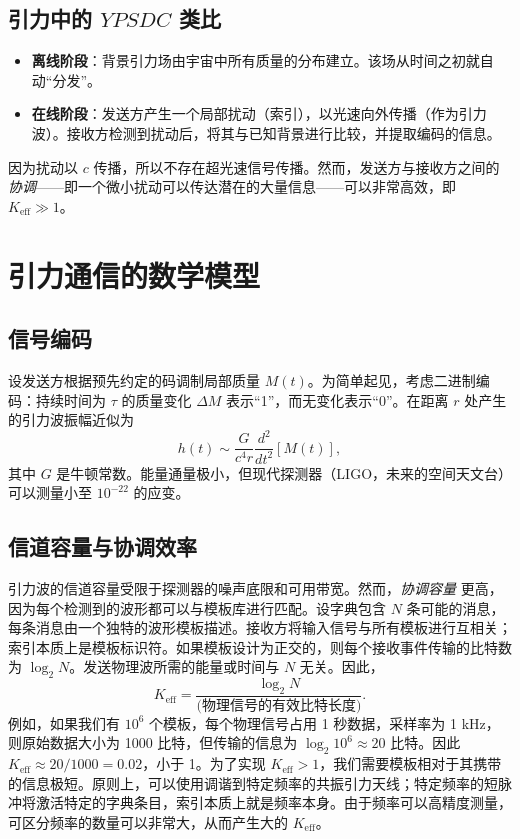 \documentclass[12pt,a4paper]{article}
\newcommand{\Keff}{K_{\mathrm{eff}}}
\newcommand{\YPSDC}{YPSDC}
\begin{document}
	\subsection{引力中的 \(\YPSDC\) 类比}
	
	\begin{itemize}
		\item \textbf{离线阶段}：背景引力场由宇宙中所有质量的分布建立。该场从时间之初就自动“分发”。
		\item \textbf{在线阶段}：发送方产生一个局部扰动（索引），以光速向外传播（作为引力波）。接收方检测到扰动后，将其与已知背景进行比较，并提取编码的信息。
	\end{itemize}
	
	因为扰动以 \(c\) 传播，所以不存在超光速信号传播。然而，发送方与接收方之间的 \emph{协调}——即一个微小扰动可以传达潜在的大量信息——可以非常高效，即 \(\Keff \gg 1\)。
	
	\section{引力通信的数学模型}
	\label{sec:model}
	
	\subsection{信号编码}
	
	设发送方根据预先约定的码调制局部质量 \(M(t)\)。为简单起见，考虑二进制编码：持续时间为 \(\tau\) 的质量变化 \(\Delta M\) 表示“1”，而无变化表示“0”。在距离 \(r\) 处产生的引力波振幅近似为
	\begin{equation}
		h(t) \sim \frac{G}{c^4 r} \frac{d^2}{dt^2} \left[ M(t) \right],
	\end{equation}
	其中 \(G\) 是牛顿常数。能量通量极小，但现代探测器（LIGO，未来的空间天文台）可以测量小至 \(10^{-22}\) 的应变。
	
	\subsection{信道容量与协调效率}
	
	引力波的信道容量受限于探测器的噪声底限和可用带宽。然而，\emph{协调容量} 更高，因为每个检测到的波形都可以与模板库进行匹配。设字典包含 \(N\) 条可能的消息，每条消息由一个独特的波形模板描述。接收方将输入信号与所有模板进行互相关；索引本质上是模板标识符。如果模板设计为正交的，则每个接收事件传输的比特数为 \(\log_2 N\)。发送物理波所需的能量或时间与 \(N\) 无关。因此，
	\begin{equation}
		\Keff = \frac{\log_2 N}{\text{(物理信号的有效比特长度)}}.
	\end{equation}
	例如，如果我们有 \(10^6\) 个模板，每个物理信号占用 1 秒数据，采样率为 1 kHz，则原始数据大小为 1000 比特，但传输的信息为 \(\log_2 10^6 \approx 20\) 比特。因此 \(\Keff \approx 20/1000 = 0.02\)，小于 1。为了实现 \(\Keff > 1\)，我们需要模板相对于其携带的信息极短。原则上，可以使用调谐到特定频率的共振引力天线；特定频率的短脉冲将激活特定的字典条目，索引本质上就是频率本身。由于频率可以高精度测量，可区分频率的数量可以非常大，从而产生大的 \(\Keff\)。
	
\end{document}
